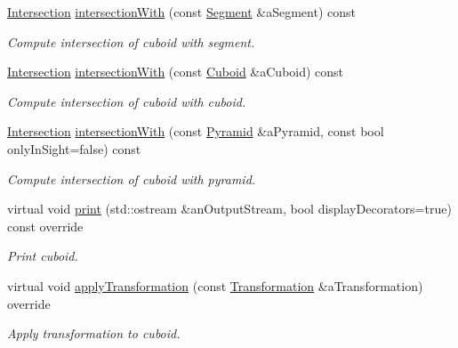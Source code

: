 \begin{DoxyCompactItemize}
\hyperlink{classlibrary_1_1math_1_1geom_1_1d3_1_1_intersection}{Intersection} \hyperlink{classlibrary_1_1math_1_1geom_1_1d3_1_1objects_1_1_cuboid_a750d30e3ac694173878034f95e86cd60}{intersection\+With} (const \hyperlink{classlibrary_1_1math_1_1geom_1_1d3_1_1objects_1_1_segment}{Segment} \&a\+Segment) const
\begin{DoxyCompactList}\small\item\em Compute intersection of cuboid with segment. \end{DoxyCompactList}\item 
\hyperlink{classlibrary_1_1math_1_1geom_1_1d3_1_1_intersection}{Intersection} \hyperlink{classlibrary_1_1math_1_1geom_1_1d3_1_1objects_1_1_cuboid_a39cb1353c26cf80e35abbda242ac2578}{intersection\+With} (const \hyperlink{classlibrary_1_1math_1_1geom_1_1d3_1_1objects_1_1_cuboid}{Cuboid} \&a\+Cuboid) const
\begin{DoxyCompactList}\small\item\em Compute intersection of cuboid with cuboid. \end{DoxyCompactList}\item 
\hyperlink{classlibrary_1_1math_1_1geom_1_1d3_1_1_intersection}{Intersection} \hyperlink{classlibrary_1_1math_1_1geom_1_1d3_1_1objects_1_1_cuboid_a127353762abd63e350dd290fd8c10e88}{intersection\+With} (const \hyperlink{classlibrary_1_1math_1_1geom_1_1d3_1_1objects_1_1_pyramid}{Pyramid} \&a\+Pyramid, const bool only\+In\+Sight=false) const
\begin{DoxyCompactList}\small\item\em Compute intersection of cuboid with pyramid. \end{DoxyCompactList}\item 
virtual void \hyperlink{classlibrary_1_1math_1_1geom_1_1d3_1_1objects_1_1_cuboid_a82f1700cef1777e918a5363a71278e99}{print} (std\+::ostream \&an\+Output\+Stream, bool display\+Decorators=true) const override
\begin{DoxyCompactList}\small\item\em Print cuboid. \end{DoxyCompactList}\item 
virtual void \hyperlink{classlibrary_1_1math_1_1geom_1_1d3_1_1objects_1_1_cuboid_a97a3057434b7c90891a5bdb1cd4b907c}{apply\+Transformation} (const \hyperlink{classlibrary_1_1math_1_1geom_1_1d3_1_1_transformation}{Transformation} \&a\+Transformation) override
\begin{DoxyCompactList}\small\item\em Apply transformation to cuboid. \end{DoxyCompactList}\end{DoxyCompactItemize}
